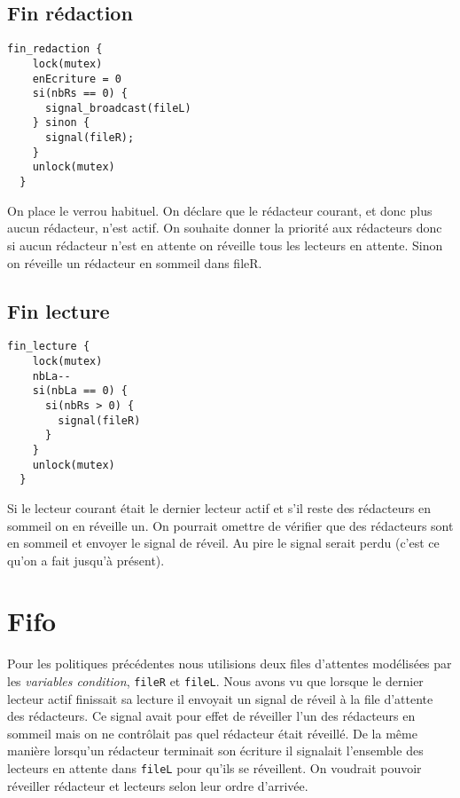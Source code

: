\documentclass[11pt]{article}
\theoremstyle{definition}
\theoremstyle{definition}
\begin{document}
\subsection{Fin rédaction}
\begin{lstlisting}[columns=fixed,basicstyle=\small\ttfamily]
  fin_redaction {
    lock(mutex)
    enEcriture = 0
    si(nbRs == 0) {
      signal_broadcast(fileL)
    } sinon {
      signal(fileR);
    }
    unlock(mutex)
  }
\end{lstlisting}
On place le verrou habituel. On déclare que le rédacteur courant, et donc plus aucun rédacteur,  n'est actif. On souhaite donner la priorité aux rédacteurs donc si aucun rédacteur n'est en attente on réveille tous les lecteurs en attente. Sinon on réveille un rédacteur en sommeil dans fileR.

\subsection{Fin lecture}
\begin{lstlisting}[columns=fixed,basicstyle=\small\ttfamily]
  fin_lecture {
    lock(mutex)
    nbLa--
    si(nbLa == 0) {
      si(nbRs > 0) {
        signal(fileR)
      }
    }
    unlock(mutex)
  }
\end{lstlisting}

Si le lecteur courant était le dernier lecteur actif et s'il reste des rédacteurs en sommeil on en réveille un. On pourrait omettre de vérifier que des rédacteurs sont en sommeil et envoyer le signal de réveil. Au pire le signal serait perdu (c'est ce qu'on a fait jusqu'à présent).














\section{Fifo}
Pour les politiques précédentes nous utilisions deux files d'attentes modélisées par les \textit{variables condition}, \texttt{fileR} et \texttt{fileL}. Nous avons vu que lorsque le dernier lecteur actif finissait sa lecture il envoyait un signal de réveil à la file d'attente des rédacteurs.
Ce signal avait pour effet de réveiller l'un des rédacteurs en sommeil mais on ne contrôlait pas quel rédacteur était réveillé.
De la même manière lorsqu'un rédacteur terminait son écriture il signalait l'ensemble des lecteurs en attente dans \texttt{fileL} pour qu'ils se réveillent. On voudrait pouvoir réveiller rédacteur et lecteurs selon leur ordre d'arrivée.
\end{document}
